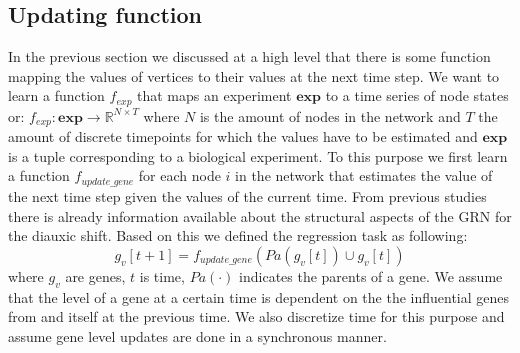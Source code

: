 \subsection{Updating function}\label{sec:update}
In the previous section we discussed at a high level that there is some function mapping the values of vertices to their values at the next time step. 
We want to learn a function $f_{exp}$ that maps an experiment $\mathbf{exp}$ to a time series of node states or: $ f_{exp}: \mathbf{exp} \to \mathbb{R}^{N \times T}$ where $N$ is the amount of nodes in the network and $T$ the amount of
discrete timepoints for which the values have to be estimated and $\mathbf{exp}$ is a tuple corresponding to a biological experiment. To this purpose we first learn a function $f_{update\_gene}$ for each node $i$ in the network that 
estimates the value of the next time step given the values of the current time.
From previous studies\cite{geistlinger2013comprehensive} there is already information available about the structural aspects of the GRN for the diauxic shift. 
Based on this we defined the regression task as following: 
\begin{equation}
 g_v[t+1] = f_{update\_gene}(Pa(g_v[t]) \cup g_v[t])
\end{equation}
where $g_v$ are genes, $t$ is time, $Pa(\cdot)$ indicates the parents of a gene.
We assume that the level of a gene at a certain time is dependent on the the influential genes from \cite{geistlinger2013comprehensive} and itself at the previous time. We also discretize time for this purpose and assume
gene level updates are done in a synchronous manner.
